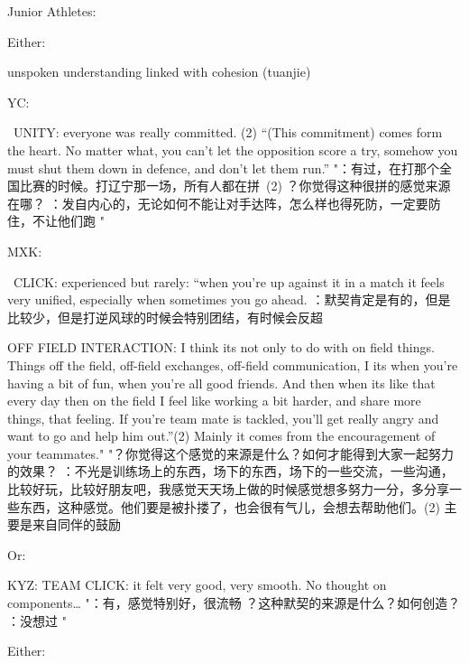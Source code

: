 \begin{CJK}{UTF8}{gbsn}
  Junior Athletes:

  Either:

  unspoken understanding linked with cohesion (tuanjie)


      YC:

       UNITY: everyone was really committed. (2) “(This commitment) comes form the heart. No matter what, you can’t let the opposition score a try, somehow you must shut them down in defence, and don’t let them run.”	"：有过，在打那个全国比赛的时候。打辽宁那一场，所有人都在拼 (2) ？你觉得这种很拼的感觉来源在哪？
      ：发自内心的，无论如何不能让对手达阵，怎么样也得死防，一定要防住，不让他们跑
      "


      MXK:

       CLICK: experienced but rarely:   “when you’re up against it in a match it feels very unified, especially when sometimes you go ahead.	：默契肯定是有的，但是比较少，但是打逆风球的时候会特别团结，有时候会反超

      OFF FIELD INTERACTION: I think its not only to do with on field things.  Things off the field, off-field exchanges, off-field communication, I its when you’re having a bit of fun, when you’re all good friends.  And then when its like that every day then on the field I feel like working a bit harder, and share more things, that feeling. If you’re team mate is tackled, you’ll get really angry and want to go and help him out.”(2) Mainly it comes from the encouragement of your teammates."	"？你觉得这个感觉的来源是什么？如何才能得到大家一起努力的效果？
      ：不光是训练场上的东西，场下的东西，场下的一些交流，一些沟通，比较好玩，比较好朋友吧，我感觉天天场上做的时候感觉想多努力一分，多分享一些东西，这种感觉。他们要是被扑搂了，也会很有气儿，会想去帮助他们。(2) 主要是来自同伴的鼓励 






  Or:

          KYZ:
          TEAM CLICK: it felt very good, very smooth.  No thought on components…	"：有，感觉特别好，很流畅
          ？这种默契的来源是什么？如何创造？
          ：没想过
          "


  Either:


\end{CJK}

